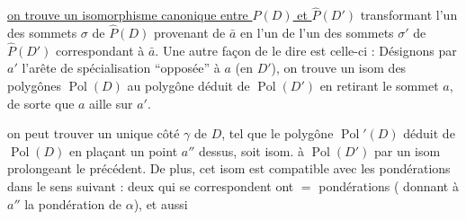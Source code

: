 \uline{on trouve un isomorphisme canonique entre $\widehat P(D)$ et $\widehat P(D')$} transformant l'un des sommets $\sigma$ de $\widehat P(D)$ provenant de $\bar a$ en  l'un \uline{}  de l'un des sommets $\sigma'$ de $\widehat P(D')$ correspondant à $\bar a$. Une autre façon de le dire est celle-ci : Désignons par $a'$ l'arête de spécialisation ``opposée'' à $a$ (en $D'$), on trouve un isom des polygônes $\operatorname{Pol}(D)$ au     polygône déduit  de $\operatorname{Pol}(D')$ en retirant le sommet $a$, de sorte que $a$ aille sur $a'$.


  on peut  trouver un unique côté $\gamma$ de $D$, tel que le polygône  $\operatorname{Pol}'(D)$ déduit de $\operatorname{Pol}(D)$ en plaçant un point $a''$ dessus, soit isom. à $\operatorname{Pol}(D')$ par un isom prolongeant le précédent. De plus, cet isom est compatible avec les pondérations dans le sens suivant : deux   qui se correspondent ont $=$ pondérations ( donnant à $a''$ la pondération de $\alpha$), et aussi

